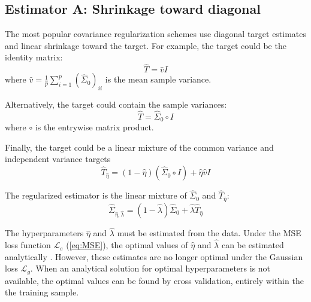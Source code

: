\subsection*{Estimator A: Shrinkage toward diagonal}
The most popular covariance regularization schemes use diagonal target estimates and linear shrinkage toward the target.  For example, the target could be the identity matrix:  
\begin{equation}
\hat T = \hat v I
\end{equation}
where $\hat v = \frac 1 p \sum\limits_{i=1}^p(\hat\Sigma_0)_{ii}$ is the mean sample variance. 

Alternatively, the target could contain the sample variances:
\begin{equation}
\hat T= \hat\Sigma_0 \circ I 
\end{equation}
where $\circ$ is the entrywise matrix product.

Finally, the target could be a linear mixture of the common variance and independent variance targets
\begin{equation}
\hat T_{\hat\eta} = (1-\hat\eta)(\hat\Sigma_0 \circ I) + \hat\eta\hat v I
\end{equation}

The regularized estimator is the linear mixture of $\hat\Sigma_0$ and $\hat T_{\hat\eta}$:
\begin{equation}
\hat\Sigma_{\hat\eta,\hat\lambda} = (1-\hat\lambda)\hat\Sigma_0 + \hat\lambda \hat T_{\hat\eta} 
\end{equation}

The hyperparameters $\hat\eta$ and $\hat\lambda$ must be estimated from the data.  Under the MSE loss function $\mathcal L_e$ (\ref{eq:MSE}), the optimal values of $\hat\eta$ and $\hat\lambda$ can be estimated analytically \cite{Ledoit:2004,Schafer:2005,Schaefer:2010}. However, these estimates are no longer optimal under the Gaussian loss $\mathcal L_g$.   When an analytical solution for optimal hyperparameters is not available, the optimal values can be found by cross validation, entirely within the the training sample.  


